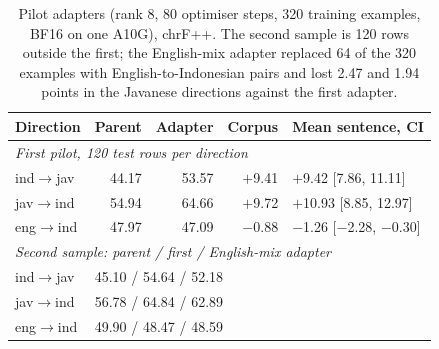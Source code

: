 \documentclass[11pt]{article}
\begin{document}
\begin{table}[ht]
\centering\small
\setlength{\tabcolsep}{1.8pt}
\begin{tabular}{lrrrl}
\toprule
Direction & Parent & Adapter & Corpus & Mean sentence, CI \\
\midrule
\multicolumn{5}{l}{\textit{First pilot, 120 test rows per direction}} \\
ind$\rightarrow$jav & 44.17 & 53.57 & $+$9.41 & $+$9.42 [7.86, 11.11] \\
jav$\rightarrow$ind & 54.94 & 64.66 & $+$9.72 & $+$10.93 [8.85, 12.97] \\
eng$\rightarrow$ind & 47.97 & 47.09 & $-$0.88 & $-$1.26 [$-$2.28, $-$0.30] \\
\midrule
\multicolumn{5}{l}{\textit{Second sample: parent / first / English-mix adapter}} \\
ind$\rightarrow$jav & \multicolumn{4}{l}{45.10 / 54.64 / 52.18} \\
jav$\rightarrow$ind & \multicolumn{4}{l}{56.78 / 64.84 / 62.89} \\
eng$\rightarrow$ind & \multicolumn{4}{l}{49.90 / 48.47 / 48.59} \\
\bottomrule
\end{tabular}
\caption{Pilot adapters (rank 8, 80 optimiser steps, 320 training examples, BF16 on one A10G), chrF++. The second
sample is 120 rows outside the first; the English-mix adapter replaced 64 of the 320 examples with
English-to-Indonesian pairs and lost 2.47 and 1.94 points in the Javanese directions against the first adapter.}
\label{tab:pilot}
\end{table}
\end{document}
